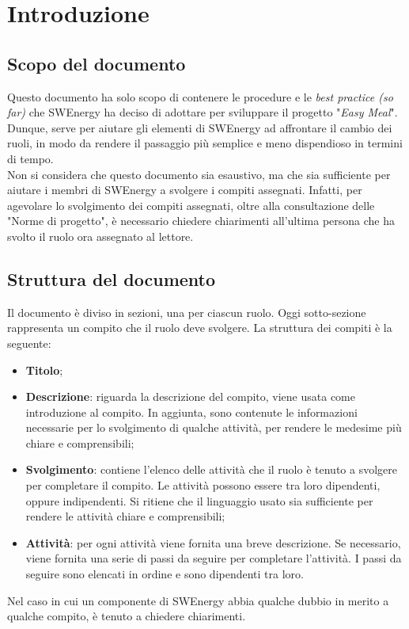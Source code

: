 \section{Introduzione}
\subsection{Scopo del documento}

Questo documento ha solo scopo di contenere le procedure e le \textit{best
	practice (so far)} che SWEnergy ha deciso di adottare per sviluppare il
progetto "\textit{Easy Meal}".
Dunque, serve per aiutare gli elementi di SWEnergy ad affrontare il cambio
dei ruoli, in modo da rendere il passaggio più semplice e meno dispendioso in
termini di tempo.\\
Non si considera che questo documento sia esaustivo, ma che sia sufficiente per
aiutare i membri di SWEnergy a svolgere i compiti assegnati. Infatti, per
agevolare lo svolgimento dei compiti assegnati, oltre alla consultazione delle
"Norme di progetto", è necessario chiedere chiarimenti all'ultima persona che ha
svolto il ruolo ora assegnato al lettore.


\subsection{Struttura del documento}

Il documento è diviso in sezioni, una per ciascun ruolo. Oggi sotto-sezione
rappresenta un compito che il ruolo deve svolgere. La struttura dei compiti è la
seguente:
\begin{itemize}
	\item \textbf{Titolo};
	\item \textbf{Descrizione}: riguarda la descrizione del compito, viene usata
	      come introduzione al compito. In aggiunta, sono contenute le
	      informazioni necessarie per lo svolgimento di qualche attività, per
	      rendere le medesime più chiare e comprensibili;

	\item \textbf{Svolgimento}: contiene l'elenco delle attività che il ruolo è
	      tenuto a svolgere per completare il compito. Le attività possono
	      essere tra loro dipendenti, oppure indipendenti. Si ritiene che il
	      linguaggio usato sia sufficiente per rendere le attività chiare e
	      comprensibili;

	\item \textbf{Attività}: per ogni attività viene fornita una breve
	      descrizione. Se necessario, viene fornita una serie di passi da
	      seguire per completare l'attività. I passi da seguire sono elencati in
	      ordine e sono dipendenti tra loro.
\end{itemize}

Nel caso in cui un componente di SWEnergy abbia qualche dubbio in merito a
qualche compito, è tenuto a chiedere chiarimenti.
